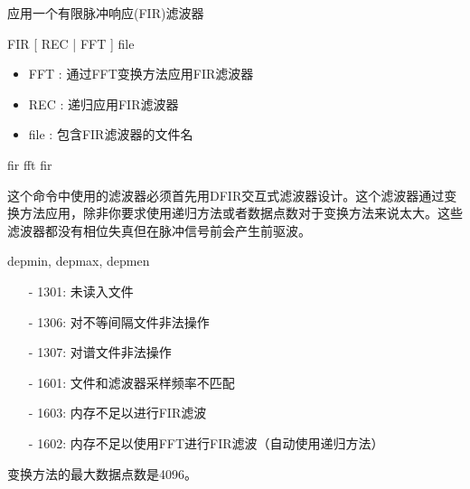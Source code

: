 \label{cmd:fir}

应用一个有限脉冲响应(FIR)滤波器

\begin{SACSTX}
FIR [ REC | FFT ] file
\end{SACSTX}

\begin{itemize}
\item FFT : 通过FFT变换方法应用FIR滤波器
\item REC : 递归应用FIR滤波器
\item file : 包含FIR滤波器的文件名
\end{itemize}
 
\begin{SACDFT}
fir fft fir
\end{SACDFT}

这个命令中使用的滤波器必须首先用DFIR交互式滤波器设计。这个滤波器通过变换方法应用，除非你要求使用递归方法或者数据点数对于变换方法来说太大。这些滤波器都没有相位失真但在脉冲信号前会产生前驱波。

depmin, depmax, depmen

\begin{itemize}
\item[-]1301: 未读入文件
\item[-]1306: 对不等间隔文件非法操作
\item[-]1307: 对谱文件非法操作
\item[-]1601: 文件和滤波器采样频率不匹配
\item[-]1603: 内存不足以进行FIR滤波
\end{itemize}

\begin{itemize}
\item[-]1602: 内存不足以使用FFT进行FIR滤波（自动使用递归方法）
\end{itemize}

变换方法的最大数据点数是4096。
